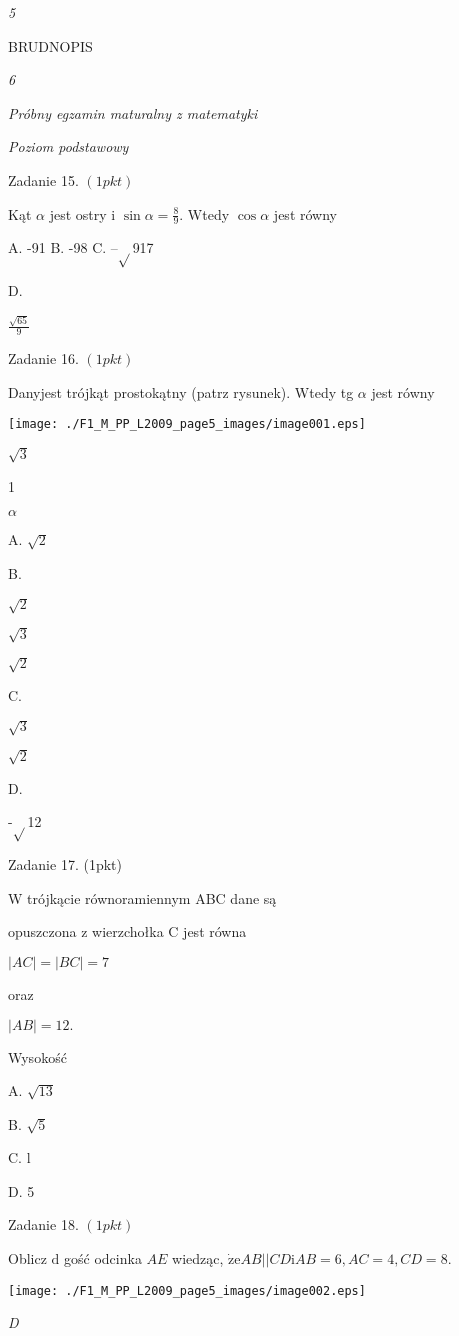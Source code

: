 \documentclass[a4paper,12pt]{article}
\begin{document}
{\it 5}

BRUDNOPIS





{\it 6}

{\it Próbny egzamin maturalny z matematyki}

{\it Poziom podstawowy}

Zadanie 15. $(1pkt)$

Kąt $\alpha$ jest ostry i $\displaystyle \sin\alpha=\frac{8}{9}$. Wtedy $\cos\alpha$ jest równy

A. -91 B. -98 C. --$\sqrt{}$917

D.

$\displaystyle \frac{\sqrt{65}}{9}$

Zadanie 16. $(1pkt)$

Danyjest trójkąt prostokątny (patrz rysunek). Wtedy tg $\alpha$ jest równy
\begin{center}
\texttt{[image: ./F1\_M\_PP\_L2009\_page5\_images/image001.eps]}
\end{center}
$\sqrt{3}$

1

$\alpha$

A. $\sqrt{2}$

B.

$\sqrt{2}$

$\sqrt{3}$

$\sqrt{2}$

C.

$\sqrt{3}$

$\sqrt{2}$

D.

-$\sqrt{}$12

Zadanie 17. (1pkt)

W trójkącie równoramiennym ABC dane są

opuszczona z wierzchołka C jest równa

$|AC|=|BC|=7$

oraz

$|AB|=12.$

Wysokość

A. $\sqrt{13}$

B. $\sqrt{5}$

C. l

D. 5

Zadanie 18. $(1pkt)$

Oblicz $\mathrm{d}$ gość odcinka $AE$ wiedząc, $\dot{\mathrm{z}}\mathrm{e}AB||CD \mathrm{i} AB=6, AC=4, CD=8.$
\begin{center}
\texttt{[image: ./F1\_M\_PP\_L2009\_page5\_images/image002.eps]}
\end{center}
{\it D}
\end{document}
